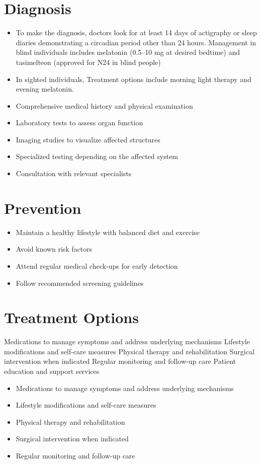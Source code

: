 \section{Diagnosis}
\begin{itemize}[noitemsep]
  \item To make the diagnosis, doctors look for at least 14 days of actigraphy or sleep diaries demonstrating a circadian period other than 24 hours. Management in blind individuals includes melatonin (0.5--10 mg at desired bedtime) and tasimelteon (approved for N24 in blind people)
  \item In sighted individuals, Treatment options include morning light therapy and evening melatonin.
  \item Comprehensive medical history and physical examination
  \item Laboratory tests to assess organ function
  \item Imaging studies to visualize affected structures
  \item Specialized testing depending on the affected system
  \item Consultation with relevant specialists
\end{itemize}
\section{Prevention}
\begin{itemize}[noitemsep]
  \item Maintain a healthy lifestyle with balanced diet and exercise
  \item Avoid known risk factors
  \item Attend regular medical check-ups for early detection
  \item Follow recommended screening guidelines
\end{itemize}
\section{Treatment Options}
Medications to manage symptoms and address underlying mechanisms Lifestyle modifications and self-care measures Physical therapy and rehabilitation Surgical intervention when indicated Regular monitoring and follow-up care Patient education and support services

\begin{itemize}[noitemsep]
  \item Medications to manage symptoms and address underlying mechanisms
  \item Lifestyle modifications and self-care measures
  \item Physical therapy and rehabilitation
  \item Surgical intervention when indicated
  \item Regular monitoring and follow-up care
\end{itemize}
